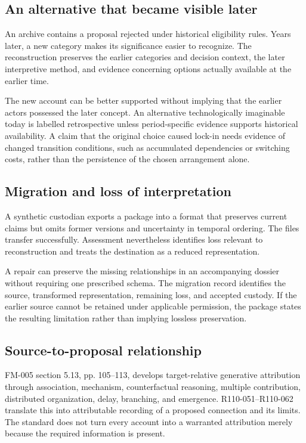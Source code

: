 \documentclass[11pt,a4paper]{article}
\begin{document}
\subsection{An alternative that became visible later}
An archive contains a proposal rejected under historical eligibility rules. Years later, a new category makes its significance easier to recognize. The reconstruction preserves the earlier categories and decision context, the later interpretive method, and evidence concerning options actually available at the earlier time.

The new account can be better supported without implying that the earlier actors possessed the later concept. An alternative technologically imaginable today is labelled retrospective unless period-specific evidence supports historical availability. A claim that the original choice caused lock-in needs evidence of changed transition conditions, such as accumulated dependencies or switching costs, rather than the persistence of the chosen arrangement alone.

\subsection{Migration and loss of interpretation}
A synthetic custodian exports a package into a format that preserves current claims but omits former versions and uncertainty in temporal ordering. The files transfer successfully. Assessment nevertheless identifies loss relevant to reconstruction and treats the destination as a reduced representation.

A repair can preserve the missing relationships in an accompanying dossier without requiring one prescribed schema. The migration record identifies the source, transformed representation, remaining loss, and accepted custody. If the earlier source cannot be retained under applicable permission, the package states the resulting limitation rather than implying lossless preservation.

\subsection{Source-to-proposal relationship}
FM-005 section 5.13, pp. 105--113, develops target-relative generative attribution through association, mechanism, counterfactual reasoning, multiple contribution, distributed organization, delay, branching, and emergence. R110-051--R110-062 translate this into attributable recording of a proposed connection and its limits. The standard does not turn every account into a warranted attribution merely because the required information is present.
\end{document}
